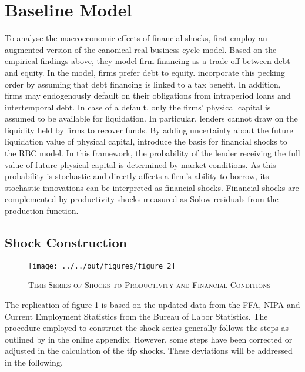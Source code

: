 \section{Baseline Model}
\label{sec:baseline_model}

To analyse the macroeconomic effects of financial shocks, \citeauthor{JERMANNfinancial} first employ an augmented version of the canonical real business cycle model. Based on the empirical findings above, they model firm financing as a trade off between debt and equity. In the model, firms prefer debt to equity. \citeauthor{JERMANNfinancial} incorporate this pecking order by assuming that debt financing is linked to a tax benefit. In addition, firms may endogenously default on their obligations from intraperiod loans and intertemporal debt. In case of a default, only the firms' physical capital is assumed to be available for liquidation. In particular, lenders cannot draw on the liquidity held by firms to recover funds. By adding uncertainty about the future liquidation value of physical capital, \citeauthor{JERMANNfinancial} introduce the basis for financial shocks to the RBC model. In this framework, the probability of the lender receiving the full value of future physical capital is determined by market conditions. As this probability is stochastic and directly affects a firm's ability to borrow, its stochastic innovations can be interpreted as financial shocks. Financial shocks are complemented by productivity shocks measured as Solow residuals from the production function.


\subsection{Shock Construction}
\label{sec:shock_construction}

\begin{figure}[ht]
    
    \centering

    \texttt{[image: ../../out/figures/figure\_2]}

    \caption{\textsc{Time Series of Shocks to Productivity and Financial Conditions}}
    
    \label{fig:figure_2}

\end{figure}

The replication of figure \ref{fig:figure_2} is based on the updated data from the FFA, NIPA and Current Employment Statistics from the Bureau of Labor Statistics.
The procedure employed to construct the shock series generally follows the steps as outlined by \citeauthor{JERMANNfinancial} in the online appendix. However, some steps have been corrected or adjusted in the calculation of the tfp shocks. These deviations will be addressed in the following. 

